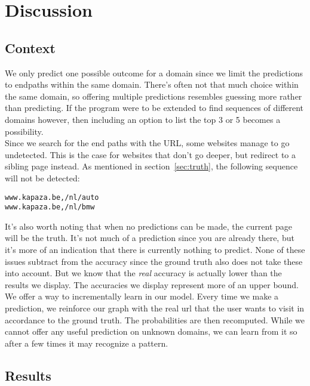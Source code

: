 \section{Discussion}\label{sec:discussion}

\subsection{Context}

We only predict one possible outcome for a domain since we limit the predictions to endpaths within the same domain. There's often not that much choice within the same domain, so offering multiple predictions resembles guessing more rather than predicting. If the program were to be extended to find sequences of different domains however, then including an option to list the top 3 or 5 becomes a possibility.
\\[2ex]
Since we search for the end paths with the URL, some websites manage to go undetected. This is the case for websites that don't go deeper, but redirect to a sibling page instead. As mentioned in section~\ref{sec:truth}, the following sequence will not be detected:
\begin{verbatim}
www.kapaza.be,/nl/auto
www.kapaza.be,/nl/bmw
\end{verbatim}
It's also worth noting that when no predictions can be made, the current page will be the truth. It's not much of a prediction since you are already there, but it's more of an indication that there is currently nothing to predict. None of these issues subtract from the accuracy since the ground truth also does not take these into account. But we know that the \textit{real} accuracy is actually lower than the results we display. The accuracies we display represent more of an upper bound.
\\[2ex]
We offer a way to incrementally learn in our model. Every time we make a prediction, we reinforce our graph with the real url that the user wants to visit in accordance to the ground truth. The probabilities are then recomputed. While we cannot offer any useful prediction on unknown domains, we can learn from it so after a few times it may recognize a pattern.

\subsection{Results}\label{subsec:results}

